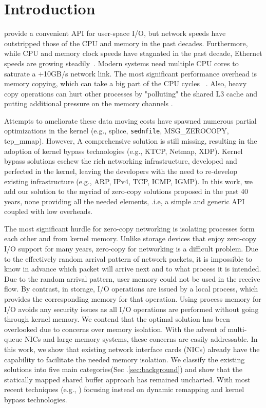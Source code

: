 \section{Introduction}

\sockets provide a convenient API for user-space I/O,  but network speeds have outstripped those of the CPU and memory in the past decades. Furthermore, while CPU and memory clock speeds have stagnated in the past decade, Ethernet speeds are growing steadily~\cite{roadmap}. Modern systems need multiple CPU cores to saturate a +10GB/s network link. The most significant performance overhead is memory copying, which can take a big part of the CPU cycles ~\cite{desendmsg}. Also, heavy copy operations can hurt other processes by "polluting" the shared L3 cache and putting additional pressure on the memory channels \cite{markuze2016true}. 

Attempts to ameliorate these data moving costs have spawned numerous partial optimizations in the kernel (e.g., splice, \texttt{sednfile}, MSG\_ZEROCOPY, tcp\_mmap). However, A comprehensive solution is still missing, resulting in the adoption of kernel bypass technologies (e.g., KTCP, Netmap, XDP). Kernel bypass solutions eschew the rich networking infrastructure, developed and perfected in the kernel, leaving the developers with the need to re-develop existing infrastructure (e.g., ARP, IPv4, TCP, ICMP, IGMP). In this work, we add our solution to the myriad of zero-copy solutions proposed in the past 40 years, none providing all the needed elements, .i.e, a simple and generic API coupled with low overheads. 


The most significant hurdle for zero-copy networking is isolating processes form each other and from kernel memory. Unlike storage devices that enjoy zero-copy I/O support for many years, zero-copy for networking is a difficult problem. Due to the effectively random arrival pattern of network packets, it is impossible to know in advance which packet will arrive next and to what process it is intended. Due to the random arrival pattern, user memory could not be used in the receive flow. By contrast, in storage, I/O operations are issued by a local process, which provides the corresponding memory for that operation. Using process memory for I/O avoids any security issues as all I/O operations are performed without going through kernel memory.
We contend that the optimal solution has been overlooked due to concerns over memory isolation. With the advent of multi-queue NICs and large memory systems, these concerns are easily addressable. In this work, we show that existing network interface cards (NICs) already have the capability to facilitate the needed memory isolation. We classify the existing solutions into five main categories(Sec .\ref{sec:background}) and show that the statically mapped shared buffer approach has remained uncharted. With most recent techniques (e.g., \cite{xdp,dpdk,rizzo2012netmap,mikelangelo,desendmsg}) focusing instead on dynamic remapping and kernel bypass technologies.

